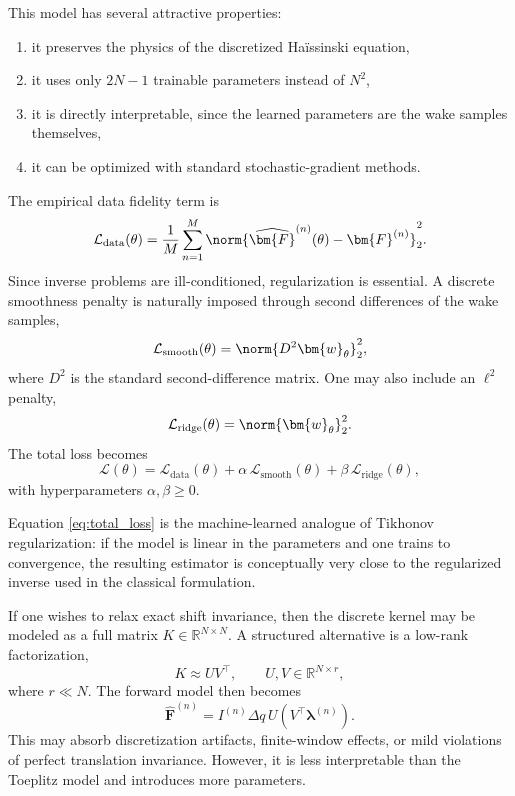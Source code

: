 \documentclass[11pt,a4paper]{article}
\begin{document}
\begin{sloppypar}
This model has several attractive properties:
\begin{enumerate}[label=(\roman*)]
\item it preserves the physics of the discretized Ha\"issinski equation,
\item it uses only $2N-1$ trainable parameters instead of $N^2$,
\item it is directly interpretable, since the learned parameters are the wake samples themselves,
\item it can be optimized with standard stochastic-gradient methods.
\end{enumerate}


The empirical data fidelity term is
\begin{equation}
\mathcal{L}_{\mathrm{data}}(\theta)=\frac{1}{M}\sum_{n=1}^{M}
\norm{\widehat{\bm{F}}^{(n)}(\theta)-\bm{F}^{(n)}}_2^2.
\end{equation}
Since inverse problems are ill-conditioned, regularization is essential. A discrete smoothness penalty is naturally imposed through second differences of the wake samples,
\begin{equation}
\mathcal{L}_{\mathrm{smooth}}(\theta)=\norm{D^2\bm{w}_{\theta}}_2^2,
\end{equation}
where $D^2$ is the standard second-difference matrix. One may also include an $\ell^2$ penalty,
\begin{equation}
\mathcal{L}_{\mathrm{ridge}}(\theta)=\norm{\bm{w}_{\theta}}_2^2.
\end{equation}
The total loss becomes
\begin{equation}
\mathcal{L}(\theta)=
\mathcal{L}_{\mathrm{data}}(\theta)
+\alpha\,\mathcal{L}_{\mathrm{smooth}}(\theta)
+\beta\,\mathcal{L}_{\mathrm{ridge}}(\theta),
\label{eq:total_loss}
\end{equation}
with hyperparameters $\alpha,\beta\ge 0$.

Equation \eqref{eq:total_loss} is the machine-learned analogue of Tikhonov regularization: if the model is linear in the parameters and one trains to convergence, the resulting estimator is conceptually very close to the regularized inverse used in the classical formulation.


If one wishes to relax exact shift invariance, then the discrete kernel may be modeled as a full matrix $K\in\mathbb{R}^{N\times N}$. A structured alternative is a low-rank factorization,
\begin{equation}
K \approx UV^{\top},
\qquad
U,V\in\mathbb{R}^{N\times r},
\end{equation}
where $r\ll N$. The forward model then becomes
\begin{equation}
\widehat{\bm{F}}^{(n)} = I^{(n)}\Delta q\,U\left(V^{\top}\bm{\lambda}^{(n)}\right).
\end{equation}
This may absorb discretization artifacts, finite-window effects, or mild violations of perfect translation invariance. However, it is less interpretable than the Toeplitz model and introduces more parameters.



\end{sloppypar}
\end{document}
